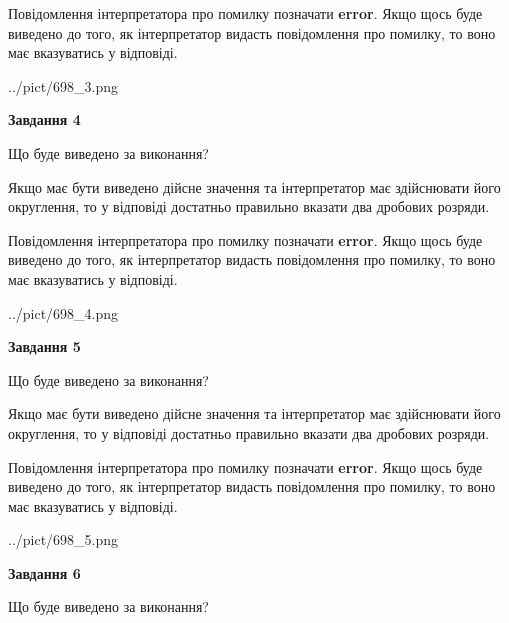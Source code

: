 \documentclass[12pt, ukrainian]{article}
\begin{document}
{\begin {Large}
Повідомлення інтерпретатора про помилку позначати \textbf{error}.
Якщо щось буде виведено до того, як інтерпретатор видасть повідомлення про помилку, 
то воно має вказуватись у відповіді. \par

\begin{center}
	{../pict/698_3.png}
\end{center}
\newpage

{\begin {center}\textbf{Завдання 4}\end {center}}\par
Що буде виведено за виконання? \par

Якщо має бути виведено дійсне значення та інтерпретатор має здійснювати його округлення, 
то у відповіді достатньо правильно вказати два дробових розряди.

Повідомлення інтерпретатора про помилку позначати \textbf{error}.
Якщо щось буде виведено до того, як інтерпретатор видасть повідомлення про помилку, 
то воно має вказуватись у відповіді. \par

\begin{center}
	{../pict/698_4.png}
\end{center}
\newpage

{\begin {center}\textbf{Завдання 5}\end {center}}\par
Що буде виведено за виконання? \par

Якщо має бути виведено дійсне значення та інтерпретатор має здійснювати його округлення, 
то у відповіді достатньо правильно вказати два дробових розряди.

Повідомлення інтерпретатора про помилку позначати \textbf{error}.
Якщо щось буде виведено до того, як інтерпретатор видасть повідомлення про помилку, 
то воно має вказуватись у відповіді. \par

\begin{center}
	{../pict/698_5.png}
\end{center}
\newpage

{\begin {center}\textbf{Завдання 6}\end {center}}\par
Що буде виведено за виконання? \par


\end{Large}}
\end{document}
